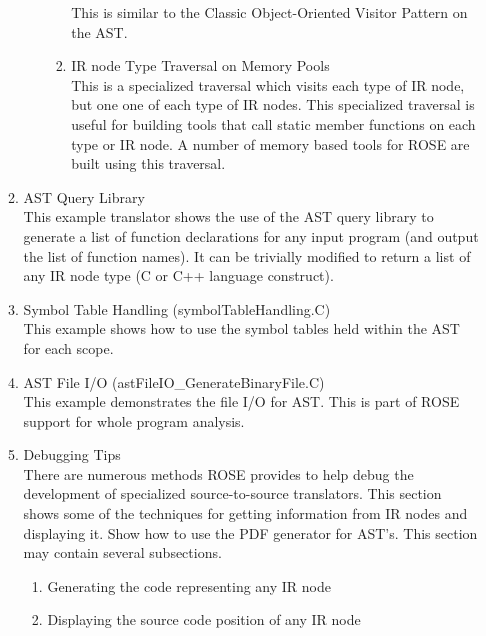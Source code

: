\begin{itemize}
\begin{enumerate}
\begin{enumerate}
\begin{enumerate}
              This is similar to the Classic Object-Oriented Visitor Pattern on the AST.
          \item IR node Type Traversal on Memory Pools \\
              This is a specialized traversal which visits each type of IR node, but one
              one of each type of IR nodes. This specialized traversal is useful for
              building tools that call static member functions on each type or IR node.
              A number of memory based tools for ROSE are built using this traversal.
        \end{enumerate}

     \end{enumerate}

     \item AST Query Library \\
           This example translator shows the use of the AST query library to generate
           a list of function declarations for any input program (and output the list
           of function names).  It can be trivially modified to return a list of any
           IR node type (C or C++ language construct).

     \item Symbol Table Handling (symbolTableHandling.C) \\
           This example shows how to use the symbol tables held within the AST for each scope.

     \item AST File I/O (astFileIO\_GenerateBinaryFile.C) \\
           This example demonstrates the file I/O for AST.  This is part of
           ROSE support for whole program analysis.

     \item Debugging Tips \\
           There are numerous methods ROSE provides to help debug the 
           development of specialized source-to-source translators.
           This section shows some of the techniques for getting
           information from IR nodes and displaying it.  Show how to 
           use the PDF generator for AST's.  This section may
           contain several subsections.
     \begin{enumerate}
          \item Generating the code representing any IR node
          \item Displaying the source code position of any IR node
     \end{enumerate}




\end{enumerate}
\end{itemize}
